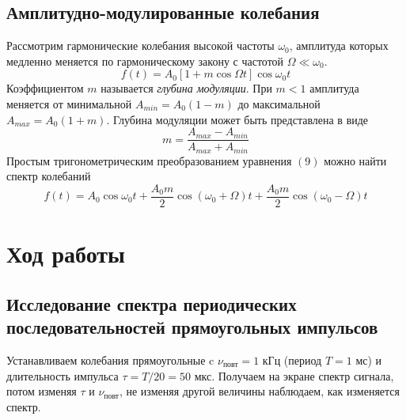 \documentclass[a4paper, 12pt]{article}%
\begin{document}
\subsection*{Амплитудно-модулированные колебания}
Рассмотрим гармонические колебания высокой частоты $\omega_0$, амплитуда которых медленно меняется по гармоническому закону с частотой $\Omega \ll \omega_0$.
\begin{equation}
f(t) = A_0 \left[1+m\cos \Omega t\right] \cos \omega_0 t
\end{equation}
Коэффициентом $m$ называется \textit{глубина модуляции}. При $m < 1$ амплитуда меняется от минимальной $A_{min} = A_0(1-m)$ до максимальной $A_{max} = A_0(1+m)$. Глубина модуляции может быть представлена в виде
\begin{equation}
m = \dfrac{A_{max}-A_{min}}{A_{max}+A_{min}}
\end{equation}
Простым тригонометрическим преобразованием уравнения $(9)$ можно найти спектр колебаний
\begin{equation}
f(t) = A_0 \cos \omega_0t + \dfrac{A_0m}{2} \cos \left(\omega_0 + \Omega\right)t + \dfrac{A_0m}{2}\cos\left(\omega_0 - \Omega\right)t
\end{equation}
\section*{Ход работы}
\subsection*{Исследование спектра периодических последовательностей прямоугольных импульсов}
Устанавливаем колебания прямоугольные c $\nu_{\text{повт}} = 1$ кГц (период $T = 1$ мс) и длительность импульса $\tau = T/20 = 50$ мкс.
Получаем на экране спектр сигнала, потом изменяя $\tau$ и $\nu_{\text{повт}}$, не изменяя другой величины наблюдаем, как изменяется спектр.
\end{document}
